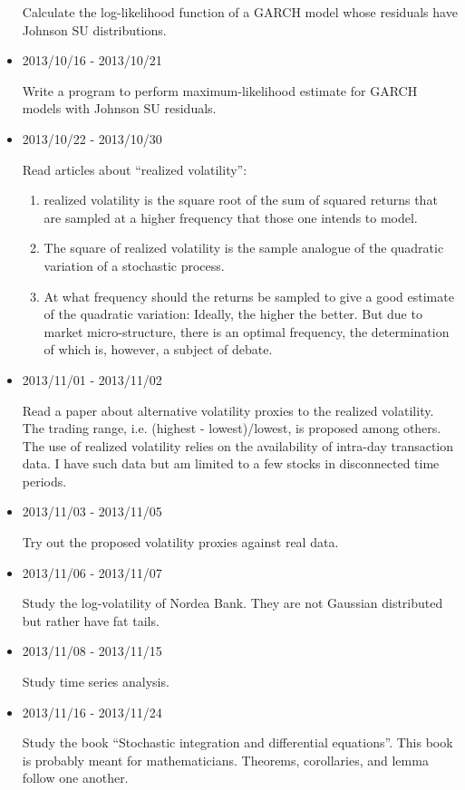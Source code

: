 \documentclass{article}
\begin{document}
\begin{itemize}
Calculate the log-likelihood function of a GARCH model whose residuals
have Johnson SU distributions.

\item 2013/10/16 - 2013/10/21

Write a program to perform maximum-likelihood estimate for GARCH
models with Johnson SU residuals.

\item 2013/10/22 - 2013/10/30

Read articles about ``realized volatility'':
\begin{enumerate}
\item realized volatility is the square root of the sum of squared
  returns that are sampled at a higher frequency that those one
  intends to model.
\item The square of realized volatility is the sample analogue of the
  quadratic variation of a stochastic process.
\item At what frequency should the returns be sampled to give a good
  estimate of the quadratic variation: Ideally, the higher the
  better. But due to market micro-structure, there is an optimal
  frequency, the determination of which is, however, a subject of
  debate.
\end{enumerate}

\item 2013/11/01 - 2013/11/02

Read a paper about alternative volatility proxies to the realized
volatility. The trading range, i.e. (highest - lowest)/lowest, is
proposed among others. The use of realized volatility relies on the
availability of intra-day transaction data. I have such data but am
limited to a few stocks in disconnected time periods.

\item 2013/11/03 - 2013/11/05

Try out the proposed volatility proxies against real data.

\item 2013/11/06 - 2013/11/07

Study the log-volatility of Nordea Bank. They are not Gaussian
distributed but rather have fat tails.

\item 2013/11/08 - 2013/11/15

Study time series analysis.

\item 2013/11/16 - 2013/11/24

Study the book ``Stochastic integration and differential
equations''. This book is probably meant for mathematicians. Theorems,
corollaries, and lemma follow one another.


\end{itemize}
\end{document}
